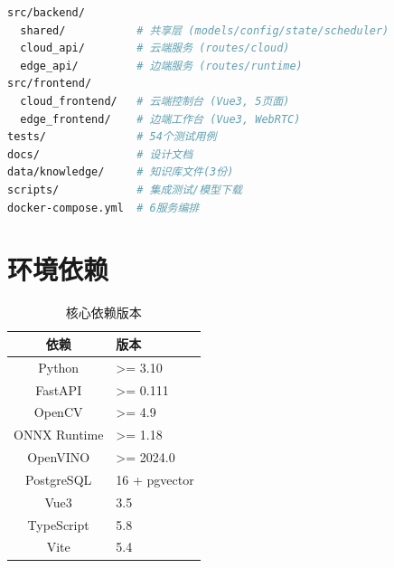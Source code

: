 \begin{lstlisting}[language=bash]
src/backend/
  shared/           # 共享层 (models/config/state/scheduler)
  cloud_api/        # 云端服务 (routes/cloud)
  edge_api/         # 边端服务 (routes/runtime)
src/frontend/
  cloud_frontend/   # 云端控制台 (Vue3, 5页面)
  edge_frontend/    # 边端工作台 (Vue3, WebRTC)
tests/              # 54个测试用例
docs/               # 设计文档
data/knowledge/     # 知识库文件(3份)
scripts/            # 集成测试/模型下载
docker-compose.yml  # 6服务编排
\end{lstlisting}

\section{环境依赖}

\begin{table}[H]
\caption{核心依赖版本}
\begin{center}
\begin{tabular}{cl}
\toprule
依赖 & 版本 \\
\midrule
Python     & >= 3.10 \\
FastAPI    & >= 0.111 \\
OpenCV     & >= 4.9 \\
ONNX Runtime & >= 1.18 \\
OpenVINO   & >= 2024.0 \\
PostgreSQL & 16 + pgvector \\
Vue3       & 3.5 \\
TypeScript & 5.8 \\
Vite       & 5.4 \\
\bottomrule
\end{tabular}
\end{center}
\label{tb:deps}
\end{table}
